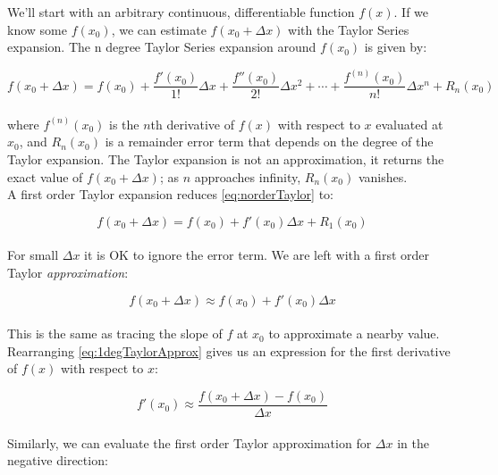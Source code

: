 {We'll start with an arbitrary continuous, differentiable function $f(x)$.  If we know some $f(x_{0})$, we can estimate $f(x_{0}+\Delta  x)$ with the Taylor Series expansion.  The n degree Taylor Series expansion around $f(x_{0})$ is given by:

 \begin{equation}\label{eq:norderTaylor}
  f(x_{0} + \Delta  x) = f(x_{0}) + \frac{f'(x_{0})}{1!}\Delta  x + \frac{f''(x_{0})}{2!}\Delta  x^{2} + \cdots  + \frac{f^{(n)}(x_{0})}{n!}\Delta  x^{n} + R_{n}(x_{0})
  \end{equation}
    \\
  where $f^{(n)}(x_{0})$ is the $n$th derivative of $f(x)$ with respect to $x$ evaluated at $x_{0}$, and $R_{n}(x_{0})$ is a remainder error term that depends on the degree of the Taylor expansion.  The Taylor expansion is not an approximation, it returns the exact value of $ f(x_{0} + \Delta  x)$; as $n$ approaches infinity, $R_{n}(x_{0})$ vanishes.\\
  

A first order Taylor expansion reduces \ref{eq:norderTaylor} to:
  
 \begin{equation}\label{eq:1degTaylor}
  f(x_{0} + \Delta  x) = f(x_{0}) + f'(x_{0})\Delta x + R_{1}(x_{0})
  \end{equation}
    \\
  For small $\Delta  x$ it is OK to ignore the error term.  We are left with a first order Taylor \textit{approximation}:
  
   \begin{equation}\label{eq:1degTaylorApprox}
  f(x_{0} + \Delta  x) \approx f(x_{0}) + f'(x_{0})\Delta x
  \end{equation}
    \\
This is the same as tracing the slope of $f$ at $x_{0}$ to approximate a nearby value.  Rearranging \ref{eq:1degTaylorApprox} gives us an expression for the first derivative of $f(x)$ with respect to $x$:

 \begin{equation}\label{eq:fdaForward}
 f'(x_{0}) \approx \frac{f(x_{0} + \Delta  x) - f(x_{0})}{\Delta  x}
  \end{equation}
    \\
Similarly, we can evaluate the first order Taylor approximation for $\Delta x$ in the negative direction:

}
